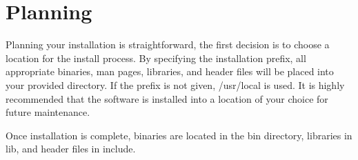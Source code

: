 \section{Planning}
Planning your installation is straightforward, the first decision is to
choose a location for the install process.   By specifying the
installation prefix, all appropriate binaries, man pages, libraries,
and header files will be placed into your provided directory.  If
the prefix is not given, /usr/local is used.  It is highly recommended
that the software is installed into a location of your choice for
future maintenance.

Once installation is complete, binaries are located in the bin
directory, libraries in lib, and header files in include.

